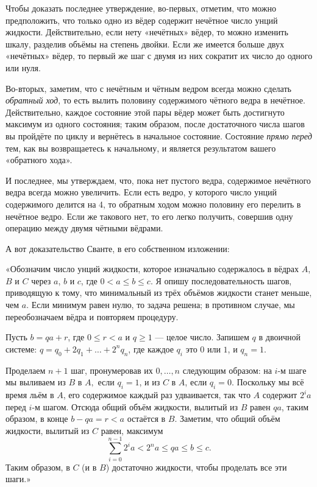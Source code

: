 Чтобы доказать последнее утверждение, во-первых, отметим, что можно предположить, что только одно из вёдер содержит нечётное число унций жидкости.
Действительно, если нету «нечётных» вёдер, то можно изменить шкалу, разделив объёмы на степень двойки.
Если же имеется больше двух «нечётных» вёдер, то первый же шаг с двумя из них сократит их число до одного или нуля.

Во-вторых, заметим, что с нечётным и чётным ведром всегда можно сделать \emph{обратный ход}, то есть вылить половину содержимого чётного ведра в нечётное.
Действительно, каждое состояние этой пары вёдер может быть достигнуто максимум из одного состояния;
таким образом, после достаточного числа шагов вы пройдёте по циклу и вернётесь в начальное состояние.
Состояние \emph{прямо перед} тем, как вы возвращаетесь к начальному, и является результатом вашего «обратного хода».

И последнее, мы утверждаем, что, пока нет пустого ведра, содержимое нечётного ведра всегда можно увеличить.
Если есть ведро, у которого число унций содержимого делится на 4, то обратным ходом можно половину его перелить в нечётное ведро.
Если же такового нет, то его легко получить, совершив одну операцию между двумя чётными вёдрами.
\heart

А вот доказательство Сванте, в его собственном изложении:

\medskip

«Обозначим число унций жидкости, которое изначально содержалось в вёдрах $A$, $B$ и $C$ через $a$, $b$ и $c$, где $0<a\le b\le c$.
Я опишу последовательность шагов, приводящую к тому, что минимальный из трёх объёмов жидкости станет меньше, чем $a$.
Если минимум равен нулю, то задача решена; в противном случае, мы переобозначаем вёдра и повторяем процедуру.

Пусть $b = qa + r$, где $0\le r<a$ и $q\ge 1$ --- целое число.
Запишем $q$ в двоичной системе: $q=q_0+2q_1+\dots+2^nq_n$, где каждое $q_i$ это $0$ или $1$, и $q_n = 1$.

Проделаем $n+1$ шаг, пронумеровав их $0,\dots, n$ следующим образом: на $i$-м шаге  мы выливаем из $B$ в $A,$ если $q_i = 1$, и из $C$ в $A$, если $q_i = 0$.
Поскольку мы всё время льём в $A$, его содержимое каждый раз удваивается, так что $A$ содержит $2^ia$ перед $i$-м шагом.
Отсюда общий объём жидкости, вылитый из $B$ равен $qa$, таким образом, в конце $b-qa=r<a$ остаётся в $B$.
Заметим, что общий объём жидкости, вылитый из $C$ равен, максимум
\[\sum_{i=0}^{n-1} 2^ia<2^na\le qa\le b\le c.\]
Таким образом, в $C$ (и в $B$) достаточно жидкости, чтобы проделать все эти шаги.»
\heart

